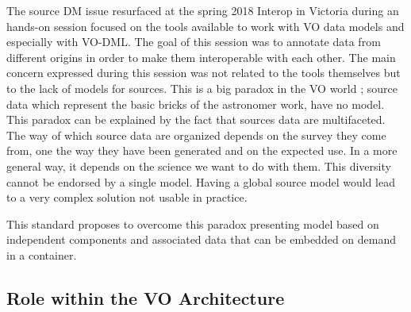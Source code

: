 \documentclass[11pt,a4paper]{ivoa}
\begin{document}
The source DM issue resurfaced at the spring 2018 Interop in Victoria during an hands-on session focused on the tools available to work with VO data models and especially with VO-DML. The goal of this session was to annotate data from different origins in order to make them interoperable with each other. The main concern expressed during this session was not related to the tools themselves but to the lack of models for sources. 
This is a big paradox in the VO world ; source data which represent the basic bricks of the astronomer work, have no model. This paradox can be explained by the fact that sources data are multifaceted. The way of which source data are organized depends on the survey they come from, one the way they have been generated  and on the expected use. In a more general way, it depends on the science we want to do with them. This diversity cannot be endorsed by a single model. Having a global source model would lead to a very complex solution not usable in practice.

This standard proposes to overcome this paradox presenting model based on independent components and associated data that can be embedded on demand in a container.


\subsection{Role within the VO Architecture}
\end{document}

